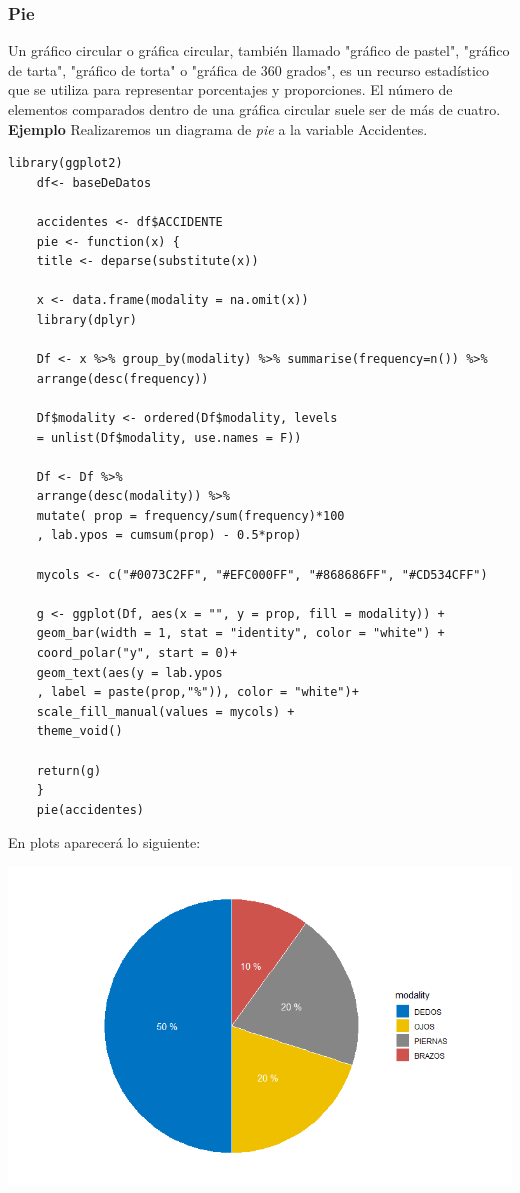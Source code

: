 \documentclass[12pt,hidelinks]{article}
\begin{document}
	\subsubsection{Pie}
	Un gráfico circular o gráfica circular, también llamado "gráfico de pastel", "gráfico de tarta", "gráfico de torta" o "gráfica de 360 grados", es un recurso estadístico que se utiliza para representar porcentajes y proporciones. El número de elementos comparados dentro de una gráfica circular suele ser de más de cuatro. \textbf{Ejemplo} Realizaremos un diagrama de \textit{pie} a la variable Accidentes.
	\begin{lstlisting}[frame=single]
	library(ggplot2)
	df<- baseDeDatos
	
	accidentes <- df$ACCIDENTE
	pie <- function(x) {
	title <- deparse(substitute(x))
	
	x <- data.frame(modality = na.omit(x))
	library(dplyr)
	
	Df <- x %>% group_by(modality) %>% summarise(frequency=n()) %>%
	arrange(desc(frequency))
	
	Df$modality <- ordered(Df$modality, levels 
	= unlist(Df$modality, use.names = F))
	
	Df <- Df %>%
	arrange(desc(modality)) %>%
	mutate( prop = frequency/sum(frequency)*100 
	, lab.ypos = cumsum(prop) - 0.5*prop)
	
	mycols <- c("#0073C2FF", "#EFC000FF", "#868686FF", "#CD534CFF")
	
	g <- ggplot(Df, aes(x = "", y = prop, fill = modality)) +
	geom_bar(width = 1, stat = "identity", color = "white") +
	coord_polar("y", start = 0)+
	geom_text(aes(y = lab.ypos
	, label = paste(prop,"%")), color = "white")+
	scale_fill_manual(values = mycols) +
	theme_void()
	
	return(g)
	}
	pie(accidentes)
	\end{lstlisting}
	En plots aparecerá lo siguiente:
	\begin{center}
		\includegraphics[width = 14cm]{images/2/GC.png}
	\end{center}
\end{document}
